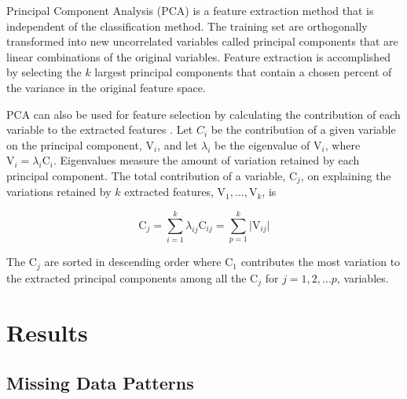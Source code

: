\documentclass[12pt,]{article}
\begin{document}
Principal Component Analysis (PCA) \citep{f.r.s_liii._1901} is a feature
extraction method that is independent of the classification method. The
training set are orthogonally transformed into new uncorrelated
variables called principal components that are linear combinations of
the original variables. Feature extraction is accomplished by selecting
the \(k\) largest principal components that contain a chosen percent of
the variance in the original feature space.

PCA can also be used for feature selection by calculating the
contribution of each variable to the extracted features
\citep{song_feature_2010}. Let \(C_i\) be the contribution of a given
variable on the principal component, \(\text{V}_i\), and let
\(\lambda_i\) be the eigenvalue of \(\text{V}_i\), where
\(\text{V}_{i} = \lambda_i \text{C}_i\). Eigenvalues measure the amount
of variation retained by each principal component. The total
contribution of a variable, \(\text{C}_j\), on explaining the variations
retained by \(k\) extracted features, \(\text{V}_1, ..., \text{V}_k\),
is

\[
\text{C}_j = \sum^k_{i=1}\lambda_{ij} \text{C}_{ij} = \sum^k_{p=1} \vert \text{V}_{ij} \vert 
\]

The \(\text{C}_j\) are sorted in descending order where \(\text{C}_1\)
contributes the most variation to the extracted principal components
among all the \(\text{C}_j\) for \(j=1,2,...p\), variables.

\newpage

\section{Results}\label{results}

\subsection{Missing Data Patterns}\label{missing-data-patterns}
\end{document}
